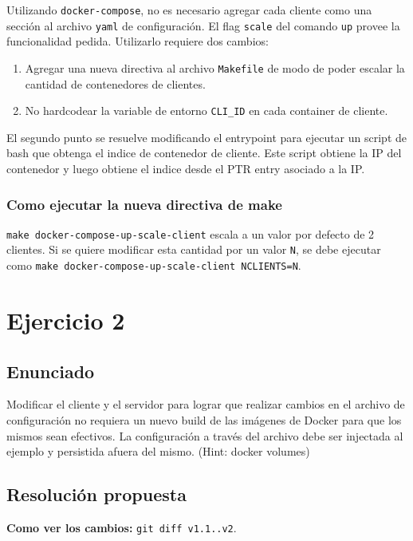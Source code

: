 \documentclass{article}
\begin{document}
Utilizando \texttt{docker-compose}, no es necesario agregar cada cliente como una sección al archivo \texttt{yaml} de configuración. El flag \texttt{\-\-scale} del comando \texttt{up}\cite{DockerComposeUp} provee la funcionalidad pedida. Utilizarlo requiere dos cambios:

\begin{enumerate}
	\item Agregar una nueva directiva al archivo \texttt{Makefile} de modo de poder escalar la cantidad de contenedores de clientes.
	\item No hardcodear la variable de entorno \texttt{CLI\_ID} en cada container de cliente.
\end{enumerate}

El segundo punto se resuelve modificando el entrypoint para ejecutar un script de bash que obtenga el indice de contenedor de cliente.\cite{IndexContainer} Este script obtiene la IP del contenedor y luego obtiene el indice desde el PTR entry asociado a la IP.

\subsubsection{Como ejecutar la nueva directiva de make}
\texttt{make docker-compose-up-scale-client} escala a un valor por defecto de 2 clientes. Si se quiere modificar esta cantidad por un valor \texttt{N}, se debe ejecutar como \texttt{make docker-compose-up-scale-client NCLIENTS=N}. \cite{MakefileOverridingVariables}

\section{Ejercicio 2}

\subsection{Enunciado}
Modificar el cliente y el servidor para lograr que realizar cambios en el archivo de configuración no requiera un nuevo build de las imágenes de Docker para que los mismos sean efectivos. La configuración a través del archivo debe ser injectada al ejemplo y persistida afuera del mismo. (Hint: docker volumes)

\subsection{Resolución propuesta}

\textbf{Como ver los cambios: }\texttt{git diff v1.1..v2}.
\end{document}
